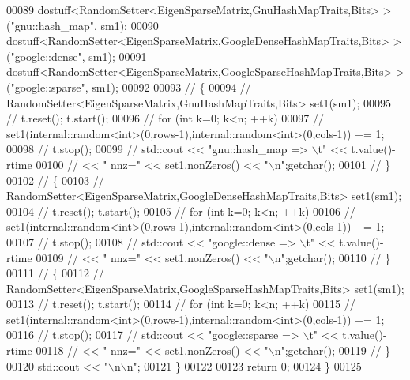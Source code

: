 \begin{DoxyCode}
00089     dostuff<RandomSetter<EigenSparseMatrix,GnuHashMapTraits,Bits> >(\textcolor{stringliteral}{"gnu::hash\_map"}, sm1);
00090     dostuff<RandomSetter<EigenSparseMatrix,GoogleDenseHashMapTraits,Bits> >(\textcolor{stringliteral}{"google::dense"}, sm1);
00091     dostuff<RandomSetter<EigenSparseMatrix,GoogleSparseHashMapTraits,Bits> >(\textcolor{stringliteral}{"google::sparse"}, sm1);
00092 
00093 \textcolor{comment}{//     \{}
00094 \textcolor{comment}{//       RandomSetter<EigenSparseMatrix,GnuHashMapTraits,Bits> set1(sm1);}
00095 \textcolor{comment}{//       t.reset(); t.start();}
00096 \textcolor{comment}{//       for (int k=0; k<n; ++k)}
00097 \textcolor{comment}{//         set1(internal::random<int>(0,rows-1),internal::random<int>(0,cols-1)) += 1;}
00098 \textcolor{comment}{//       t.stop();}
00099 \textcolor{comment}{//       std::cout << "gnu::hash\_map => \(\backslash\)t" << t.value()-rtime}
00100 \textcolor{comment}{//                 << " nnz=" << set1.nonZeros() << "\(\backslash\)n";getchar();}
00101 \textcolor{comment}{//     \}}
00102 \textcolor{comment}{//     \{}
00103 \textcolor{comment}{//       RandomSetter<EigenSparseMatrix,GoogleDenseHashMapTraits,Bits> set1(sm1);}
00104 \textcolor{comment}{//       t.reset(); t.start();}
00105 \textcolor{comment}{//       for (int k=0; k<n; ++k)}
00106 \textcolor{comment}{//         set1(internal::random<int>(0,rows-1),internal::random<int>(0,cols-1)) += 1;}
00107 \textcolor{comment}{//       t.stop();}
00108 \textcolor{comment}{//       std::cout << "google::dense => \(\backslash\)t" << t.value()-rtime}
00109 \textcolor{comment}{//                 << " nnz=" << set1.nonZeros() << "\(\backslash\)n";getchar();}
00110 \textcolor{comment}{//     \}}
00111 \textcolor{comment}{//     \{}
00112 \textcolor{comment}{//       RandomSetter<EigenSparseMatrix,GoogleSparseHashMapTraits,Bits> set1(sm1);}
00113 \textcolor{comment}{//       t.reset(); t.start();}
00114 \textcolor{comment}{//       for (int k=0; k<n; ++k)}
00115 \textcolor{comment}{//         set1(internal::random<int>(0,rows-1),internal::random<int>(0,cols-1)) += 1;}
00116 \textcolor{comment}{//       t.stop();}
00117 \textcolor{comment}{//       std::cout << "google::sparse => \(\backslash\)t" << t.value()-rtime}
00118 \textcolor{comment}{//                 << " nnz=" << set1.nonZeros() << "\(\backslash\)n";getchar();}
00119 \textcolor{comment}{//     \}}
00120     std::cout << \textcolor{stringliteral}{"\(\backslash\)n\(\backslash\)n"};
00121   \}
00122 
00123   \textcolor{keywordflow}{return} 0;
00124 \}
00125 
\end{DoxyCode}
